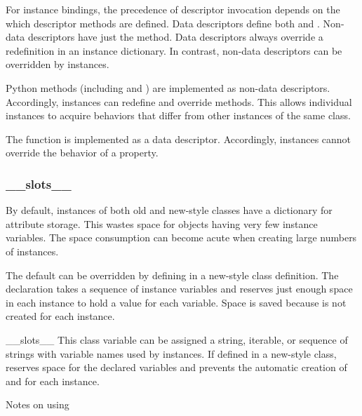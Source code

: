 For instance bindings, the precedence of descriptor invocation depends
on the which descriptor methods are defined.  Data descriptors define
both  and .  Non-data descriptors have
just the  method.  Data descriptors always override
a redefinition in an instance dictionary.  In contrast, non-data
descriptors can be overridden by instances.

Python methods (including  and )
are implemented as non-data descriptors.  Accordingly, instances can
redefine and override methods.  This allows individual instances to acquire
behaviors that differ from other instances of the same class.                     

The  function is implemented as a data descriptor.
Accordingly, instances cannot override the behavior of a property.


\subsubsection{__slots__\label{slots}}

By default, instances of both old and new-style classes have a dictionary
for attribute storage.  This wastes space for objects having very few instance
variables.  The space consumption can become acute when creating large numbers
of instances.

The default can be overridden by defining  in a new-style class
definition.  The  declaration takes a sequence of instance
variables and reserves just enough space in each instance to hold a value
for each variable.  Space is saved because  is not created for
each instance.
    
\begin{datadesc}{__slots__}
This class variable can be assigned a string, iterable, or sequence of strings
with variable names used by instances.  If defined in a new-style class,
 reserves space for the declared variables
and prevents the automatic creation of  and 
for each instance.
\end{datadesc}

\noindent
Notes on using 

